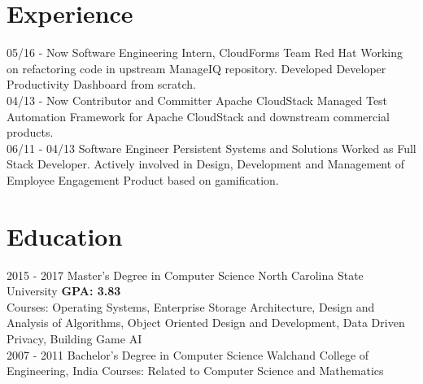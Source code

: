 \documentclass[]{friggeri-cv}
\begin{document}
\section{Experience}
\begin{entrylist}
  \entry
    {05/16 - Now
    Software Engineering Intern, CloudForms Team}
    {Red Hat}
    {Working on refactoring code in upstream ManageIQ repository. Developed Developer Productivity Dashboard from scratch.\\}
  \entry
    {04/13 - Now}
    {Contributor and Committer}
    {Apache CloudStack}
    {Managed Test Automation Framework for Apache CloudStack and downstream commercial products.\\}
    \entry
    {06/11 - 04/13}
    {Software Engineer}
    {Persistent Systems and Solutions}
    {Worked as Full Stack Developer. Actively involved in Design, Development and Management of Employee Engagement Product based on gamification.\\}
\end{entrylist}
\section{Education}
\begin{entrylist}
  \entry
    {2015 - 2017}
    {Master's Degree in Computer Science}
    {North Carolina State University}
    {\textbf{GPA: 3.83}\\Courses: Operating Systems, Enterprise Storage Architecture, Design and Analysis of Algorithms, Object Oriented Design and Development, Data Driven Privacy, Building Game AI\\}
  \entry
    {2007 - 2011}
    {Bachelor's Degree in Computer Science}
    {Walchand College of Engineering, India}
    {Courses: Related to Computer Science and Mathematics\\}
\end{entrylist}
\end{document}
